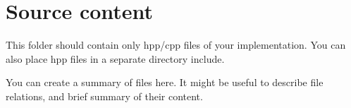 \chapter{Source content}
\hypertarget{md_src_2readme}{}\label{md_src_2readme}
\label{md_src_2readme_autotoc_md0}%
%
 This folder should contain only hpp/cpp files of your implementation. You can also place hpp files in a separate directory {\ttfamily include}.

You can create a summary of files here. It might be useful to describe file relations, and brief summary of their content. 